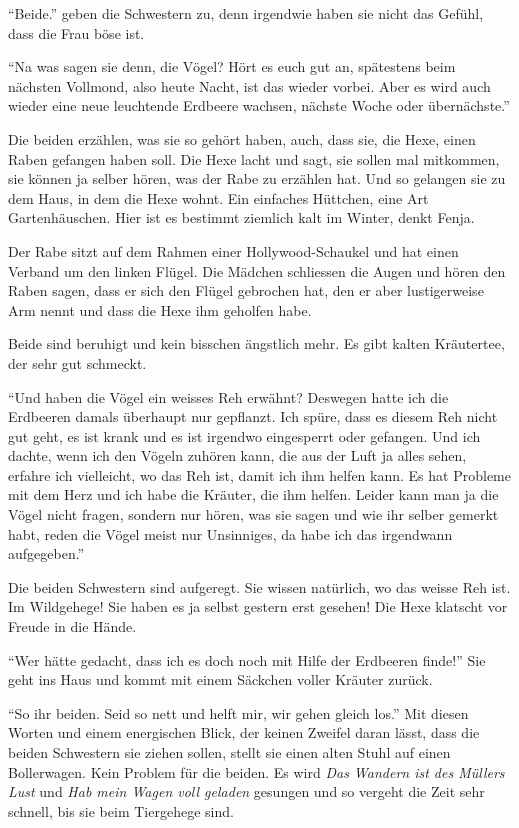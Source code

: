 \enquote{Beide.} geben die Schwestern zu, denn irgendwie haben sie nicht das Gefühl, dass die Frau böse ist. 

\enquote{Na was sagen sie denn, die Vögel? Hört es euch gut an, spätestens beim nächsten Vollmond, also heute Nacht, ist das wieder vorbei. Aber es wird auch wieder eine neue leuchtende Erdbeere wachsen, nächste Woche oder übernächste.} 

Die beiden erzählen, was sie so gehört haben, auch, dass sie, die Hexe, einen Raben gefangen haben soll. Die Hexe lacht und sagt, sie sollen mal mitkommen, sie können ja selber hören, was der Rabe zu erzählen hat. Und so gelangen sie zu dem Haus, in dem die Hexe wohnt. Ein einfaches Hüttchen, eine Art Gartenhäuschen. Hier ist es bestimmt ziemlich kalt im Winter, denkt Fenja. 

Der Rabe sitzt auf dem Rahmen einer Hollywood-Schaukel und hat einen Verband um den linken Flügel. Die Mädchen schliessen die Augen und hören den Raben sagen, dass er sich den Flügel gebrochen hat, den er aber lustigerweise Arm nennt und dass die Hexe ihm geholfen habe.

Beide sind beruhigt und kein bisschen ängstlich mehr. Es gibt kalten Kräutertee, der sehr gut schmeckt. 

\enquote{Und haben die Vögel ein weisses Reh erwähnt? Deswegen hatte ich die Erdbeeren damals überhaupt nur gepflanzt. Ich spüre, dass es diesem Reh nicht gut geht, es ist krank und es ist irgendwo eingesperrt oder gefangen. Und ich dachte, wenn ich den Vögeln zuhören kann, die aus der Luft ja alles sehen, erfahre ich vielleicht, wo das Reh ist, damit ich ihm helfen kann. Es hat Probleme mit dem Herz und ich habe die Kräuter, die ihm helfen. Leider kann man ja die Vögel nicht fragen, sondern nur hören, was sie sagen und wie ihr selber gemerkt habt, reden die Vögel meist nur Unsinniges, da habe ich das irgendwann aufgegeben.}

Die beiden Schwestern sind aufgeregt. Sie wissen natürlich, wo das weisse Reh ist. Im Wildgehege! Sie haben es ja selbst gestern erst gesehen! Die Hexe klatscht vor Freude in die Hände. 

\enquote{Wer hätte gedacht, dass ich es doch noch mit Hilfe der Erdbeeren finde!} Sie geht ins Haus und kommt mit einem Säckchen voller Kräuter zurück. 

\enquote{So ihr beiden. Seid so nett und helft mir, wir gehen gleich los.} Mit diesen Worten und einem energischen Blick, der keinen Zweifel daran lässt, dass die beiden Schwestern sie ziehen sollen, stellt sie einen alten Stuhl auf einen Bollerwagen. Kein Problem für die beiden. Es wird \textit{Das Wandern ist des Müllers Lust} und \textit{Hab mein Wagen voll geladen} gesungen und so vergeht die Zeit sehr schnell, bis sie beim Tiergehege sind.


